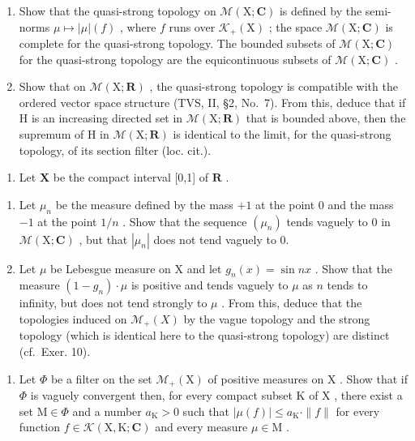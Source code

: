 \begin{enumerate}
\def\labelenumi{\alph{enumi})}
\item
  Show that the quasi-strong topology on \(\mathcal{M}(\mathrm{X};\mathbf{C})\) is defined by the semi-norms \(\mu \mapsto |\mu |(f)\) , where \(f\) runs over \(\mathcal{K}_{+}(\mathrm{X})\) ; the space \(\mathcal{M}(\mathrm{X};\mathbf{C})\) is complete for the quasi-strong topology. The bounded subsets of \(\mathcal{M}(\mathrm{X};\mathbf{C})\) for the quasi-strong topology are the equicontinuous subsets of \(\mathcal{M}(\mathrm{X};\mathbf{C})\) .
\item
  Show that on \(\mathcal{M}(\mathrm{X};\mathbf{R})\) , the quasi-strong topology is compatible with the ordered vector space structure (TVS, II, §2, No.~7). From this, deduce that if H is an increasing directed set in \(\mathcal{M}(\mathrm{X};\mathbf{R})\) that is bounded above, then the supremum of H in \(\mathcal{M}(\mathrm{X};\mathbf{R})\) is identical to the limit, for the quasi-strong topology, of its section filter (loc. cit.).
\end{enumerate}

\begin{enumerate}
\def\labelenumi{\arabic{enumi})}
\setcounter{enumi}{8}
\tightlist
\item
  Let \(\mathbf{X}\) be the compact interval {[}0,1{]} of \(\mathbf{R}\) .
\end{enumerate}

\begin{enumerate}
\def\labelenumi{\alph{enumi})}
\item
  Let \(\mu_{n}\) be the measure defined by the mass \(+1\) at the point 0 and the mass \(-1\) at the point \(1/n\) . Show that the sequence \((\mu_{n})\) tends vaguely to 0 in \(\mathcal{M}(\mathrm{X};\mathbf{C})\) , but that \(|\mu_n|\) does not tend vaguely to 0.
\item
  Let \(\mu\) be Lebesgue measure on X and let \(g_{n}(x) = \sin nx\) . Show that the measure \((1 - g_{n}) \cdot \mu\) is positive and tends vaguely to \(\mu\) as \(n\) tends to infinity, but does not tend strongly to \(\mu\) . From this, deduce that the topologies induced on \(\mathcal{M}_{+}(X)\) by the vague topology and the strong topology (which is identical here to the quasi-strong topology) are distinct (cf.~Exer. 10).
\end{enumerate}

\begin{enumerate}
\def\labelenumi{\arabic{enumi})}
\setcounter{enumi}{9}
\tightlist
\item
  Let \(\Phi\) be a filter on the set \(\mathcal{M}_{+}(\mathrm{X})\) of positive measures on \(\mathrm{X}\) . Show that if \(\Phi\) is vaguely convergent then, for every compact subset \(\mathrm{K}\) of \(\mathrm{X}\) , there exist a set \(\mathrm{M} \in \Phi\) and a number \(a_{\mathrm{K}} > 0\) such that \(|\mu(f)| \leqslant a_{\mathrm{K}} \cdot \|f\|\) for every function \(f \in \mathcal{K}(\mathrm{X}, \mathrm{K}; \mathbf{C})\) and every measure \(\mu \in \mathrm{M}\) .
\end{enumerate}


